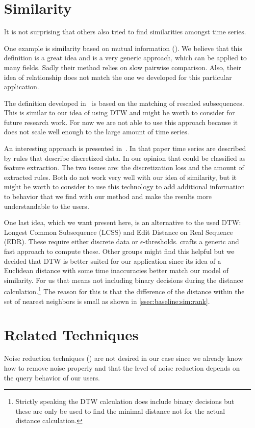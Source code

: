 \section{Similarity}
\label{sec:prior:sim}

It is not surprising that others also tried to find similarities amongst time series.

One example is similarity based on mutual information (\cite{MISE}). We believe that this definition is a great idea and is a very generic approach, which can be applied to many fields. Sadly their method relies on slow pairwise comparison. Also, their idea of relationship does not match the one we developed for this particular application.

The definition developed in~\cite{sim1} is based on the matching of rescaled subsequences. This is similar to our idea of using DTW and might be worth to consider for future research work. For now we are not able to use this approach because it does not scale well enough to the large amount of time series.

An interesting approach is presented in~\cite{sim2}. In that paper time series are described by rules that describe discretized data. In our opinion that could be classified as feature extraction. The two issues are: the discretization loss and the amount of extracted rules. Both do not work very well with our idea of similarity, but it might be worth to consider to use this technology to add additional information to behavior that we find with our method and make the results more understandable to the users.

One last idea, which we want present here, is an alternative to the used DTW\@: Longest Common Subsequence (LCSS) and Edit Distance on Real Sequence (EDR). These require either discrete data or $\epsilon$-thresholds. \cite{sim3} crafts a generic and fast approach to compute these. Other groups might find this helpful but we decided that DTW is better suited for our application since its idea of a Euclidean distance with some time inaccuracies better match our model of similarity. For us that means not including binary decisions during the distance calculation.\footnote{Strictly speaking the DTW calculation does include binary decisions but these are only be used to find the minimal distance not for the actual distance calculation.} The reason for this is that the difference of the distance within the set of nearest neighbors is small as shown in \autoref{ssec:baseline:sim:rank}.



\section{Related Techniques}
\label{sec:prior:other}

Noise reduction techniques (\cite{noise1}) are not desired in our case since we already know how to remove noise properly and that the level of noise reduction depends on the query behavior of our users.

